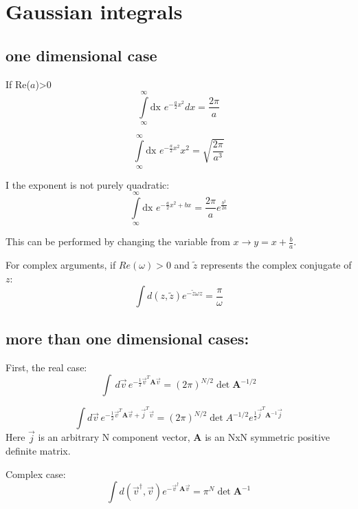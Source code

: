 \section{Gaussian integrals}

\subsection{one dimensional case}
If Re($a$)>0
\begin{equation}
\int\limits_\infty^\infty \text{dx } e^{-\frac{a}{2} x^2} dx= \frac{2 \pi}{a}
\end{equation}

\begin{equation}
\int\limits_\infty^\infty \text{dx } e^{-\frac{a}{2} x^2} x^2 = \sqrt{\frac{2 \pi}{a^3}}
\end{equation}

I the exponent is not purely quadratic:
\begin{equation}
\int\limits_\infty^\infty \text{dx } e^{-\frac{a}{2}x^2 + bx} = \frac{2\pi}{a} e^{\frac{b^2}{2a}}
\end{equation}

This can be performed by changing the variable from $x \rightarrow y = x + \frac{b}{a}$.

For complex arguments, if $Re(\omega) >0$ and $\tilde{z}$ represents the complex conjugate of $z$:
\begin{equation}
\int d(z,\tilde{z}) e^{-\tilde{z}\omega z} = \frac{\pi}{\omega}
\end{equation}

\subsection{more than one dimensional cases:}
First, the real case:
\begin{equation}
\int \,d\vec{v}\, e^{-\frac{1}{2}\vec{v}^T \textbf{A} \vec{v}} = (2\pi)^{N/2} \det\textbf{A}^{-1/2}
\end{equation}

\begin{equation}
\int d\vec{v}\, e^{-\frac{1}{2}\vec{v}^T \textbf{A}\vec{v} +\vec{j}^T \vec{v}} = (2\pi)^{N/2} \det A^{-1/2} e^{\frac{1}{2} \vec{j}^T \textbf{A}^{-1}\vec{j}}
\end{equation}
Here $\vec{j}$ is an arbitrary N component vector, \textbf{A} is an NxN symmetric positive definite matrix.

Complex case:
\begin{equation}
\int d(\vec{v}^\dagger,\vec{v}) e^{-\vec{v}^\dagger \textbf{A}\vec{v}} = \pi^N \det \textbf{A}^{-1}
\end{equation}